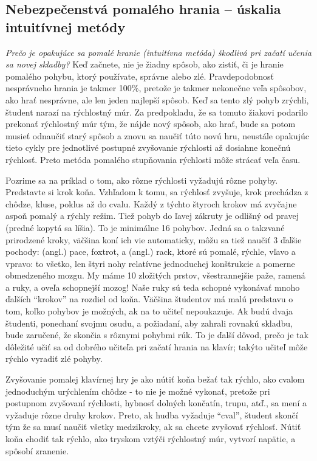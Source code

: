 \subsection{Nebezpečenstvá pomalého hrania – úskalia intuitívnej metódy}
\emph{Prečo je opakujúce sa pomalé hranie (intuitívna metóda) škodlivá pri začatí učenia sa novej skladby?} Keď začnete, nie je žiadny spôsob, ako zistiť, či je hranie pomalého pohybu, ktorý používate, správne alebo zlé. Pravdepodobnosť nesprávneho hrania je takmer 100\%, pretože je takmer nekonečne veľa spôsobov, ako hrať nesprávne, ale len jeden najlepší spôsob. Keď sa tento zlý pohyb zrýchli, študent narazí na rýchlostný múr. Za predpokladu, že sa tomuto žiakovi podarilo prekonať rýchlostný múr tým, že nájde nový spôsob, ako hrať, bude sa potom musieť odnaučiť starý spôsob a znovu sa naučiť túto novú hru, neustále opakujúc tieto cykly pre jednotlivé postupné zvyšovanie rýchlosti až dosiahne konečnú rýchlosť. Preto metóda pomalého stupňovania rýchlosti môže strácať veľa času.

Pozrime sa na príklad o tom, ako rôzne rýchlosti vyžadujú rôzne pohyby. Predstavte si krok koňa. Vzhľadom k tomu, sa rýchlosť zvyšuje, krok prechádza z chôdze, kluse, poklus až do cvalu. Každý z týchto štyroch krokov má zvyčajne aspoň pomalý a rýchly režim. Tiež pohyb do ľavej zákruty je odlišný od pravej (predné kopytá sa líšia). To je minimálne 16 pohybov. Jedná sa o takzvané prirodzené kroky, väčšina koní ich vie automaticky, môžu sa tiež naučiť 3 ďalšie pochody: (angl.) pace, foxtrot, a (angl.) rack, ktoré sú pomalé, rýchle, vľavo a vpravo: to všetko, len štyri nohy relatívne jednoduchej konštrukcie a pomerne obmedzeného mozgu. My máme 10 zložitých prstov, všestrannejšie paže, ramená a ruky, a oveľa schopnejší mozog! Naše ruky sú teda schopné vykonávať mnoho ďalších “krokov” na rozdiel od koňa. Väčšina študentov má malú predstavu o tom, koľko pohybov je možných, ak na to učiteľ nepoukazuje. Ak budú dvaja študenti, ponechaní svojmu osudu, a požiadaní, aby zahrali rovnakú skladbu, bude zaručené, že skončia s rôznymi pohybmi rúk. To je ďalší dôvod, prečo je tak dôležité učiť sa od dobrého učiteľa pri začatí hrania na klavír; takýto učiteľ môže rýchlo vyradiť zlé pohyby.

Zvyšovanie pomalej klavírnej hry je ako nútiť koňa bežať tak rýchlo, ako cvalom jednoduchým urýchlením chôdze - to nie je možné vykonať, pretože pri postupnom zvyšovaní rýchlosti, hybnosť dolných končatín, trupu, atď., sa mení a vyžaduje rôzne druhy krokov. Preto, ak hudba vyžaduje “cval”, študent skončí tým že sa musí naučiť všetky medzikroky, ak sa chcete zvyšovať rýchlosť. Nútiť koňa chodiť tak rýchlo, ako tryskom vztýči rýchlostný múr, vytvorí napätie, a spôsobí zranenie.

